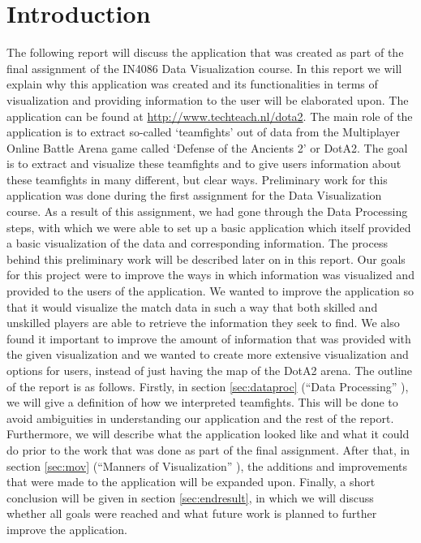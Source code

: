 \documentclass[11pt,twoside,a4paper]{article}
\begin{document}
\section*{Introduction}
The following report will discuss the application that was created as part of the final assignment of the IN4086 Data Visualization course. In this report we will explain why this application was created and its functionalities in terms of visualization and providing information to the user will be elaborated upon. The application can be found at \url{http://www.techteach.nl/dota2}.
\newline\newline
The main role of the application is to extract so-called `teamfights' out of data from the Multiplayer Online Battle Arena game called `Defense of the Ancients 2' or DotA2. The goal is to extract and visualize these teamfights and to give users information about these teamfights in many different, but clear ways.
\newline\newline
Preliminary work for this application was done during the first assignment for the Data Visualization course. As a result of this assignment, we had gone through the Data Processing steps, with which we were able to set up a basic application which itself provided a basic visualization of the data and corresponding information. The process behind this preliminary work will be described later on in this report.
\newline\newline
Our goals for this project were to improve the ways in which information was visualized and provided to the users of the application. We wanted to improve the application so that it would visualize the match data in such a way that both skilled and unskilled players are able to retrieve the information they seek to find. We also found it important to improve the amount of information that was provided with the given visualization and we wanted to create more extensive visualization and options for users, instead of just having the map of the DotA2 arena.
\newline\newline
The outline of the report is as follows. Firstly, in section \ref{sec:dataproc} (``Data Processing'' ), we will give a definition of how we interpreted teamfights. This will be done to avoid ambiguities in understanding our application and the rest of the report. Furthermore, we will describe what the application looked like and what it could do prior to the work that was done as part of the final assignment. After that, in  section \ref{sec:mov} (``Manners of Visualization'' ), the additions and improvements that were made to the application will be expanded upon. Finally, a short conclusion will be given in section \ref{sec:endresult}, in which we will discuss whether all goals were reached and what future work is planned to further improve the application.
\end{document}
